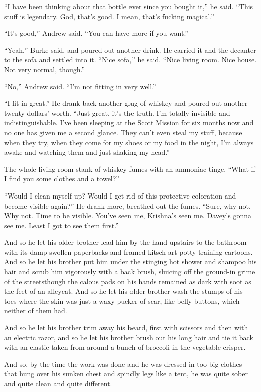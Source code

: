 ``I have been thinking about that bottle ever since you bought it,''
he said.  ``This stuff is legendary.  God, that's good.  I mean,
that's fucking magical.''

``It's good,'' Andrew said.  ``You can have more if you want.''

``Yeah,'' Burke said, and poured out another drink.  He carried it and
the decanter to the sofa and settled into it.  ``Nice sofa,'' he said. 
``Nice living room.  Nice house.  Not very normal, though.''

``No,'' Andrew said.  ``I'm not fitting in very well.''

``I fit in great.'' He drank back another glug of whiskey and poured
out another twenty dollars' worth.  ``Just great, it's the truth.  I'm
totally invisible and indistinguishable.  I've been sleeping at the
Scott Mission for six months now and no one has given me a second
glance.  They can't even steal my stuff, because when they try, when
they come for my shoes or my food in the night, I'm always awake and
watching them and just shaking my head.''

The whole living room stank of whiskey fumes with an ammoniac tinge. 
``What if I find you some clothes and a towel?''

``Would I clean myself up?  Would I get rid of this protective
coloration and become visible again?'' He drank more, breathed out the
fumes.  ``Sure, why not.  Why not.  Time to be visible.  You've seen
me, Krishna's seen me.  Davey's gonna see me.  Least I got to see them
first.''

And so he let his older brother lead him by the hand upstairs to the
bathroom with its damp-swollen paperbacks and framed kitsch-art
potty-training cartoons.  And so he let his brother put him under the
stinging hot shower and shampoo his hair and scrub him vigorously with
a back brush, sluicing off the ground-in grime of the streets\dash{}though
the calous pads on his hands remained as dark with soot as the feet of
an alleycat.  And so he let his older brother wash the stumps of his
toes where the skin was just a waxy pucker of scar, like belly
buttons, which neither of them had.

And so he let his brother trim away his beard, first with scissors and
then with an electric razor, and so he let his brother brush out his
long hair and tie it back with an elastic taken from around a bunch of
broccoli in the vegetable crisper.

And so, by the time the work was done and he was dressed in too-big
clothes that hung over his sunken chest and spindly legs like a tent,
he was quite sober and quite clean and quite different.

